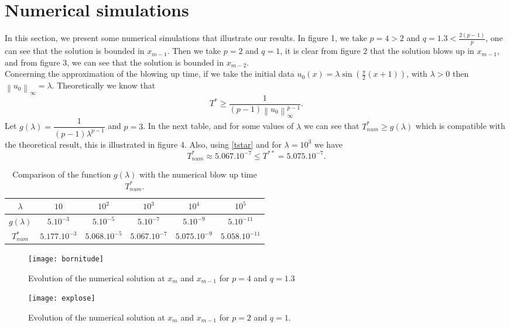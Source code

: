 \documentclass[a4paper,12pt,english,reqno]{smfart}
\begin{document}
	\section{Numerical simulations}
	In this section, we present some numerical simulations that illustrate our results. In figure 1, we take $p=4>2$ and $q=1.3<\frac{2(p-1)}{p}$, one can see that the solution is bounded in $x_{m-1}$. Then we take $p=2$ and $q=1$, it is clear from figure 2 that the solution blows up in $x_{m-1},$ and from figure 3, we can see that the solution is bounded in $x_{m-2}.$\\
	Concerning the approximation of the blowing up time, if we take the initial data $u_{0}(x)=\lambda \sin(\frac{\pi}{2}(x+1))$, with $\lambda>0$ then $\left\|u_{0}\right\|_{\infty}=\lambda$. Theoretically we know that 
	\begin{equation*}
	T^{*}\geq \dfrac{1}{(p-1)\left\|u_{0}\right\|_{\infty}^{p-1}}.
	\end{equation*}
	Let $g(\lambda)=\dfrac{1}{(p-1)\lambda^{p-1}}$ and $p=3$. In the next table, and for some values of $\lambda$ we can see that $T^{*}_{num}\geq g(\lambda)$ which is compatible with the theoretical result, this is illustrated in figure 4.
	 Also, using \eqref{tstar} and for $\lambda=10^{3}$ we have $$T^{*}_{num}\approx 5.067.10^{-7}\leq T^{**}=5.075.10^{-7}.$$ 
	\begin{table}[H]
		
		
		\centering
		\begin{tabular}{|*{6}{c|}}
			\hline
			$\lambda$& $10$&$10^{2}$&$10^{3}$&$10^{4}$&$10^{5}$ \rule[-7pt]{0pt}{20pt}\\ \hline
			$g(\lambda)$&$5.10^{-3}$&$5.10^{-5}$&$5.10^{-7}$&$5.10^{-9}$&$5.10^{-11}$ \rule[-7pt]{0pt}{20pt}\\ \hline
			$T^{*}_{num}$&$5.177.10^{-3}$&$5.068.10^{-5}$&$5.067.10^{-7}$&$5.075.10^{-9}$&$5.058.10^{-11}$ \rule[-7pt]{0pt}{20pt}\\ \hline
		\end{tabular}
		\vspace{0.5cm}
			\caption{Comparison of the function $g(\lambda)$ with the numerical blow up time $T^{*}_{num}$.}
		
			\label{tab:1}       
		
		
		
	\end{table}	
	\begin{figure}[H]
		\begin{minipage}[b]{0.40\linewidth}
			\centering
			\texttt{[image: bornitude]}
			\caption{Evolution of the numerical solution at $x_{m}$ and $x_{m-1}$ for $p=4$ and $q=1.3$}
		\end{minipage}\hfill
		\begin{minipage}[b]{0.40\linewidth}
			\centering
			\texttt{[image: explose]}
			\caption{Evolution of the numerical solution at $x_{m}$ and $x_{m-1}$ for $p=2$ and $q=1.$}
		\end{minipage}
	\end{figure}
\end{document}
